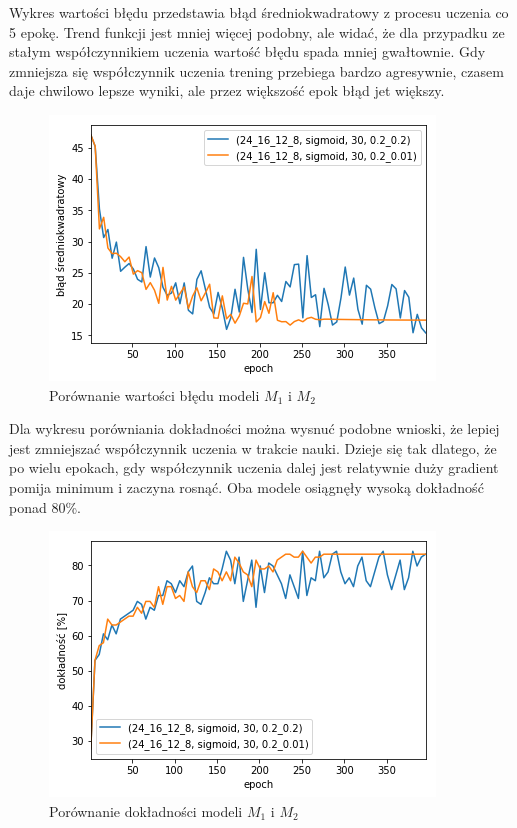 \documentclass{report}
\begin{document}
    Wykres wartości błędu przedstawia błąd średniokwadratowy z procesu uczenia co 5 epokę.
    Trend funkcji jest mniej więcej podobny, ale widać, że dla przypadku ze stałym współczynnikiem uczenia wartość błędu spada mniej gwałtownie.
    Gdy zmniejsza się współczynnik uczenia trening przebiega bardzo agresywnie, czasem daje chwilowo lepsze wyniki, ale przez większość epok błąd jet większy.

    \begin{figure}[htp]
        \centering
        \includegraphics[scale=0.8]{./img/lr-error.png}
        \caption{Porównanie wartości błędu modeli $M_1$ i $M_2$}
    \end{figure}

    Dla wykresu porówniania dokładności można wysnuć podobne wnioski, że lepiej jest zmniejszać współczynnik uczenia w trakcie nauki.
    Dzieje się tak dlatego, że po wielu epokach, gdy współczynnik uczenia dalej jest relatywnie duży gradient pomija minimum i zaczyna rosnąć.
    Oba modele osiągnęły wysoką dokładność ponad 80\%.

    \begin{figure}[htp]
        \centering
        \includegraphics[scale=0.8]{././img/lr-accuracy.png}
        \caption{Porównanie dokładności modeli $M_1$ i $M_2$}
    \end{figure}
\end{document}
